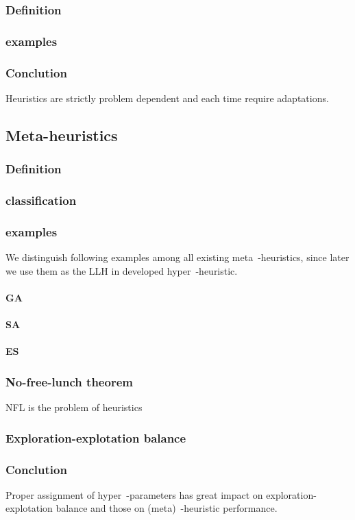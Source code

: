 \subsubsection{Definition}
\subsubsection{examples}
\subsubsection{Conclution} 
Heuristics are strictly problem dependent and each time require adaptations.

\subsection{Meta-heuristics}
\subsubsection{Definition}
\subsubsection{classification}
\subsubsection{examples}
We distinguish following examples among all existing meta~-heuristics, since later we use them as the LLH in developed hyper~-heuristic.
\paragraph{GA}
\paragraph{SA}
\paragraph{ES}
\subsubsection{No-free-lunch theorem} 
NFL is the problem of heuristics\cite{wolpert1997no}
\subsubsection{Exploration-explotation balance}
\subsubsection{Conclution} 
Proper assignment of hyper~-parameters has great impact on exploration-explotation balance and those on (meta)~-heuristic performance. 

